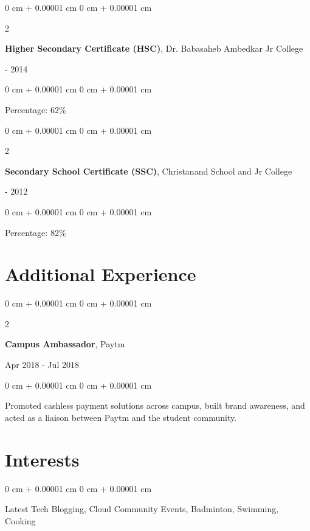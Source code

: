 \documentclass[10pt, letterpaper]{article}
\newenvironment{onecolentry}{
    \begin{adjustwidth}{
        0 cm + 0.00001 cm
    }{
        0 cm + 0.00001 cm
    }
}{
    \end{adjustwidth}
}
\newenvironment{twocolentry}[2][]{
    \onecolentry
    \def\secondColumn{#2}
    \setcolumnwidth{\fill, 4.5 cm}
    \begin{paracol}{2}
}{
    \switchcolumn \raggedleft \secondColumn
    \end{paracol}
    \endonecolentry
}
\begin{document}
\vspace{0.2 cm}

\begin{twocolentry}{2013 - 2014}
    \textbf{Higher Secondary Certificate (HSC)}, Dr. Babasaheb Ambedkar Jr College
\end{twocolentry}
\vspace{0.05 cm}
\begin{onecolentry}
    Percentage: 62\%
\end{onecolentry}

\vspace{0.2 cm}

\begin{twocolentry}{2011 - 2012}
    \textbf{Secondary School Certificate (SSC)}, Christanand School and Jr College
\end{twocolentry}
\vspace{0.05 cm}
\begin{onecolentry}
    Percentage: 82\%
\end{onecolentry}

\vspace{0.3 cm}

\section{Additional Experience}

\vspace{0.2 cm}

\begin{twocolentry}{Apr 2018 - Jul 2018}
    \textbf{Campus Ambassador}, Paytm
\end{twocolentry}
\vspace{0.05 cm}
\begin{onecolentry}
    Promoted cashless payment solutions across campus, built brand awareness, and acted as a liaison between Paytm and the student community.
\end{onecolentry}

\section{Interests}
\vspace{0.10 cm}
\begin{onecolentry}
Latest Tech Blogging, Cloud Community Events, Badminton, Swimming, Cooking
\end{onecolentry}
\end{document}
